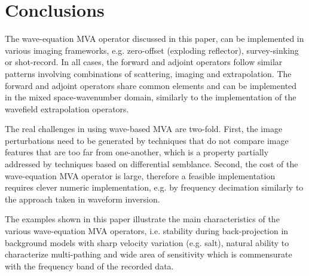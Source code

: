 \section{Conclusions}

The wave-equation MVA operator discussed in this paper, can be
implemented in various imaging frameworks, e.g. zero-offset (exploding
reflector), survey-sinking or shot-record. In all cases, the forward
and adjoint operators follow similar patterns involving combinations
of scattering, imaging and extrapolation. The forward and adjoint
operators share common elements and can be implemented in the mixed
space-wavenumber domain, similarly to the implementation of the
wavefield extrapolation operators.


The real challenges in using wave-based MVA are two-fold. First, the
image perturbations need to be generated by techniques that do not
compare image features that are too far from one-another, which is a
property partially addressed by techniques based on differential
semblance. Second, the cost of the wave-equation MVA operator is
large, therefore a feasible implementation requires clever numeric
implementation, e.g. by frequency decimation similarly to the approach
taken in waveform inversion.

The examples shown in this paper illustrate the main characteristics
of the various wave-equation MVA operators, i.e. stability during
back-projection in background models with sharp velocity variation
(e.g. salt), natural ability to characterize multi-pathing and wide
area of sensitivity which is commensurate with the frequency band of
the recorded data.

